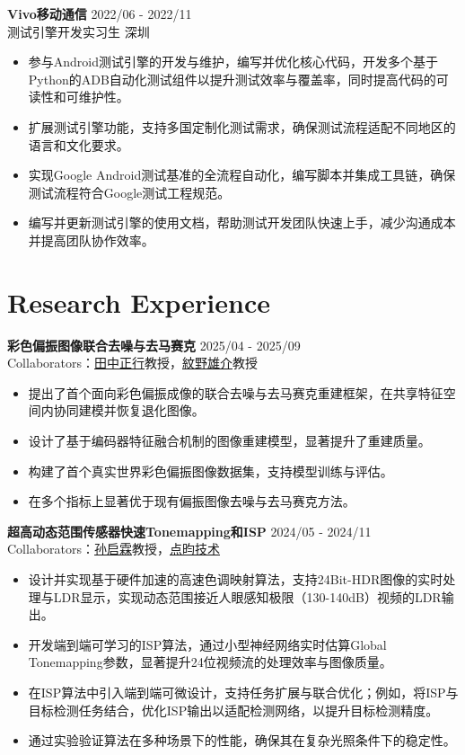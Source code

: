 \documentclass[a4paper,11pt]{article}
\newcommand{\projectspace}{\vspace{8pt}}
\begin{document}
\textbf{Vivo移动通信} \hfill 2022/06 - 2022/11 \\
 测试引擎开发实习生 \hfill 深圳
\begin{itemize}[noitemsep]
\item 参与Android测试引擎的开发与维护，编写并优化核心代码，开发多个基于Python的ADB自动化测试组件以提升测试效率与覆盖率，同时提高代码的可读性和可维护性。
\item 扩展测试引擎功能，支持多国定制化测试需求，确保测试流程适配不同地区的语言和文化要求。
\item 实现Google Android测试基准的全流程自动化，编写脚本并集成工具链，确保测试流程符合Google测试工程规范。
\item 编写并更新测试引擎的使用文档，帮助测试开发团队快速上手，减少沟通成本并提高团队协作效率。
\end{itemize}

\section*{Research Experience}
\textbf{彩色偏振图像联合去噪与去马赛克} \hfill 2025/04 - 2025/09 \\
Collaborators：\href{https://www.vip.sc.eng.isct.ac.jp/mtanaka/}{田中正行}教授，\href{http://www.ok.sc.e.titech.ac.jp/~ymonno/}{紋野雄介}教授
\begin{itemize}[noitemsep]
\item 提出了首个面向彩色偏振成像的联合去噪与去马赛克重建框架，在共享特征空间内协同建模并恢复退化图像。
\item 设计了基于编码器特征融合机制的图像重建模型，显著提升了重建质量。
\item 构建了首个真实世界彩色偏振图像数据集，支持模型训练与评估。
\item 在多个指标上显著优于现有偏振图像去噪与去马赛克方法。
\end{itemize}

\projectspace
\textbf{超高动态范围传感器快速Tonemapping和ISP} \hfill 2024/05 - 2024/11 \\
Collaborators：\href{https://scholar.google.com/citations?hl=zh-CN&user=igqPS8sAAAAJ&view_op=list_works&sortby=pubdate}{孙启霖}教授，\href{https://www.pointspread.cn/}{点昀技术}
\begin{itemize}[noitemsep]
\item 设计并实现基于硬件加速的高速色调映射算法，支持24Bit-HDR图像的实时处理与LDR显示，实现动态范围接近人眼感知极限（130-140dB）视频的LDR输出。
\item 开发端到端可学习的ISP算法，通过小型神经网络实时估算Global Tonemapping参数，显著提升24位视频流的处理效率与图像质量。
\item 在ISP算法中引入端到端可微设计，支持任务扩展与联合优化；例如，将ISP与目标检测任务结合，优化ISP输出以适配检测网络，以提升目标检测精度。
\item 通过实验验证算法在多种场景下的性能，确保其在复杂光照条件下的稳定性。
\end{itemize}
\end{document}
